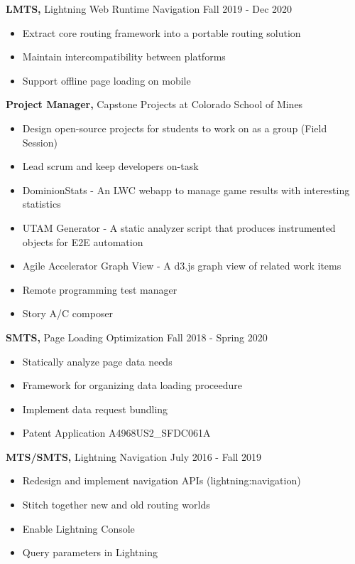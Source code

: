 \documentclass[12pt]{res}
\begin{document}
\begin{resume}
{\bf LMTS,} Lightning Web Runtime Navigation \hfill Fall 2019 - Dec 2020
\begin{itemize} \itemsep -2pt
    \item Extract core routing framework into a portable routing solution
    \item Maintain intercompatibility between platforms
    \item Support offline page loading on mobile
\end{itemize}

{\bf Project Manager,} Capstone Projects at Colorado School of Mines
\begin{itemize} \itemsep -2pt
    \item Design open-source projects for students to work on as a group (Field Session)
    \item Lead scrum and keep developers on-task
    \item DominionStats - An LWC webapp to manage game results with interesting statistics
    \item UTAM Generator - A static analyzer script that produces instrumented objects for E2E automation
    \item Agile Accelerator Graph View - A d3.js graph view of related work items
    \item Remote programming test manager
    \item Story A/C composer
\end{itemize}

{\bf SMTS,} Page Loading Optimization \hfill Fall 2018 - Spring 2020
\begin{itemize} \itemsep -2pt
    \item Statically analyze page data needs
    \item Framework for organizing data loading proceedure
    \item Implement data request bundling
    \item Patent Application A4968US2\_SFDC061A
\end{itemize}

{\bf MTS/SMTS,} Lightning Navigation \hfill July 2016 - Fall 2019
\begin{itemize} \itemsep -2pt
    \item Redesign and implement navigation APIs (lightning:navigation)
    \item Stitch together new and old routing worlds
    \item Enable Lightning Console
    \item Query parameters in Lightning
\end{itemize}


\end{resume}
\end{document}
